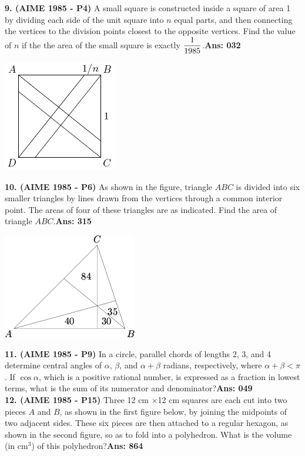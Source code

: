 \documentclass[letterpaper,10pt,addpoints]{exam}
\begin{document}
\textbf{9. (AIME 1985 - P4) } A small square is constructed inside a square of area 1 by dividing each side of the unit square into $n$ equal parts, and then connecting the vertices to the division points closest to the opposite vertices. Find the value of $n$ if the the area of the small square is exactly $\mathlarger{\frac1{1985}}$.\quad  \textbf{Ans: 032}
\begin{center}
\includegraphics[scale=0.6]{AIME_1985_Problem_4.png}
\end{center}

\textbf{10. (AIME 1985 - P6) }As shown in the figure, triangle $ABC$ is divided into six smaller triangles by lines drawn from the vertices through a common interior point. The areas of four of these triangles are as indicated. Find the area of triangle $ABC$.\quad  \textbf{Ans: 315}
\begin{center}
\includegraphics[scale=0.6]{AIME_1985_Problem_6.png}
\end{center}

\textbf{11. (AIME 1985 - P9) }In a circle, parallel chords of lengths 2, 3, and 4 determine central angles of $\alpha$, $\beta$, and $\alpha + \beta$ radians, respectively, where $\alpha + \beta < \pi$. If $\cos \alpha$, which is a positive rational number, is expressed as a fraction in lowest terms, what is the sum of its numerator and denominator?\quad  \textbf{Ans: 049}\\

\textbf{12. (AIME 1985 - P15) }Three 12 cm $\times$12 cm squares are each cut into two pieces $A$ and $B$, as shown in the first figure below, by joining the midpoints of two adjacent sides. These six pieces are then attached to a regular hexagon, as shown in the second figure, so as to fold into a polyhedron. What is the volume (in $\mathrm{cm}^3$) of this polyhedron?\quad  \textbf{Ans: 864}
\end{document}
